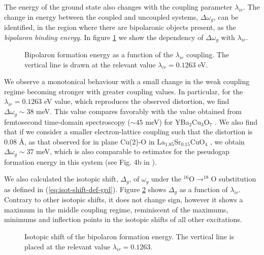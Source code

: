 The energy of the ground state also changes with the coupling parameter $\lambda_{ir}$.
The change in energy between the coupled and uncoupled systems, $\Delta\omega_{g}$, can be identified, in the region where there are bipolaronic objects present, as the \textit{bipolaron binding energy}.
In figure \ref{fig:polaronFormation} we show the dependency of $\Delta\omega_{g}$ with $\lambda_{ir}$.

\begin{figure}[ht]
  \centering
  
  \caption[Bipolaron formation energy as a function of the $\lambda_{ir}$ coupling. ]
  {Bipolaron formation energy as a function of the $\lambda_{ir}$ coupling. The vertical line is drawn at the relevant value $\lambda_{ir}=0.1263$ eV.}
  \label{fig:polaronFormation}
\end{figure}

We observe a monotonical behaviour with a small change in the weak coupling regime becoming stronger with greater coupling values.
In particular, for the $\lambda_{ir}=0.1263$ eV value, which reproduces the observed distortion, we find $\Delta\omega_{g} \sim 38$ meV.
This value compares favorably with the value obtained from femtosecond time-domain spectroscopy ($\sim 45$ meV) for YBa$_2$Cu$_3$O$_7$ \cite{Demsar1999}. 
We also find that if we consider a smaller electron-lattice coupling such that the distortion is 0.08 \AA, as that observed for in plane Cu(2)-O in La$_{1.85}$Sr$_{0.15}$CuO$_4$ \cite{Bianconi1996}, we obtain $\Delta\omega_{g} \sim 37$ meV, which is also comparable to estimates for the pseudogap formation energy in this system (see Fig. 4b in \cite{Kusar2005}).

We also calculated the isotopic shift, $\Delta_g$, of $\omega_g$ under the $^{16}$O$\rightarrow ^{18}$O substitution as defined in (\ref{eq:isot-shift-def-grd}).
Figure \ref{fig:isotPolaronFormation} shows $\Delta_g$ as a function of $\lambda_{ir}$.
Contrary to other isotopic shifts, it does not change sign, however it shows a maximum in the middle coupling regime, reminiscent of the maximums, minimums and inflection points in the isotopic shifts of all other excitations.

\begin{figure}[ht]
  \centering
  
  \caption[Isotopic shift of the bipolaron formation energy.]
  {Isotopic shift of the bipolaron formation energy. The vertical line is placed at the relevant value $\lambda_{ir}=0.1263$.}
  \label{fig:isotPolaronFormation}
\end{figure}



